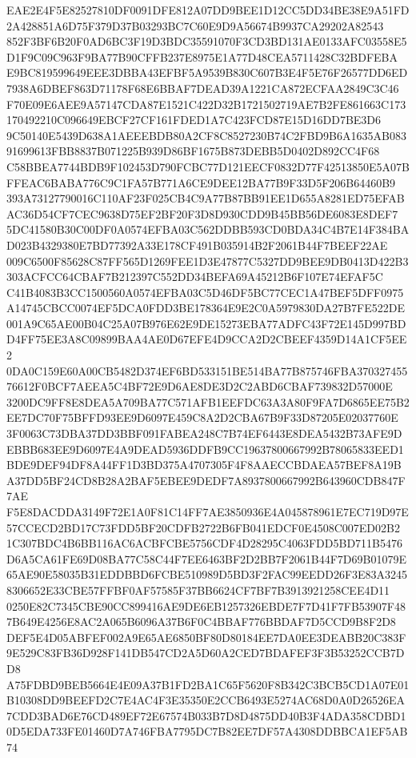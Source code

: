 \documentclass[UTF8,fontset=fandol,zihao=-4,a4paper]{ctexart}
\begin{document}
{{EAE2E4F5E82527810DF0091DFE812A07DD9BEE1D12CC5DD34BE38E9A51FD2A428851A6D75F379D37B03293BC7C60E9D9A56674B9937CA29202A82543
852F3BF6B20F0AD6BC3F19D3BDC35591070F3CD3BD131AE0133AFC03558E5D1F9C09C963F9BA77B90CFFB237E8975E1A77D48CEA5711428C32BDFEBA
E9BC819599649EEE3DBBA43EFBF5A9539B830C607B3E4F5E76F26577DD6ED7938A6DBEF863D71178F68E6BBAF7DEAD39A1221CA872ECFAA2849C3C46
F70E09E6AEE9A57147CDA87E1521C422D32B1721502719AE7B2FE861663C173170492210C096649EBCF27CF161FDED1A7C423FCD87E15D16DD7BE3D6
9C50140E5439D638A1AEEEBDB80A2CF8C8527230B74C2FBD9B6A1635AB08391699613FBB8837B071225B939D86BF1675B873DEBB5D0402D892CC4F68
C58BBEA7744BDB9F102453D790FCBC77D121EECF0832D77F42513850E5A07BFFEAC6BABA776C9C1FA57B771A6CE9DEE12BA77B9F33D5F206B64460B9
393A73127790016C110AF23F025CB4C9A77B87BB91EE1D655A8281ED75EFABAC36D54CF7CEC9638D75EF2BF20F3D8D930CDD9B45BB56DE6083E8DEF7
5DC41580B30C00DF0A0574EFBA03C562DDBB593CD0BDA34C4B7E14F384BAD023B4329380E7BD77392A33E178CF491B035914B2F2061B44F7BEEF22AE
009C6500F85628C87FF565D1269FEE1D3E47877C5327DD9BEE9DB0413D422B3303ACFCC64CBAF7B212397C552DD34BEFA69A45212B6F107E74EFAF5C
C41B4083B3CC1500560A0574EFBA03C5D46DF5BC77CEC1A47BEF5DFF0975A14745CBCC0074EF5DCA0FDD3BE178364E9E2C0A5979830DA27B7FE522DE
001A9C65AE00B04C25A07B976E62E9DE15273EBA77ADFC43F72E145D997BDD4FF75EE3A8C09899BAA4AE0D67EFE4D9CCA2D2CBEEF4359D14A1CF5EE2
0DA0C159E60A00CB5482D374EF6BD533151BE514BA77B875746FBA37032745576612F0BCF7AEEA5C4BF72E9D6AE8DE3D2C2ABD6CBAF739832D57000E
3200DC9FF8E8DEA5A709BA77C571AFB1EEFDC63A3A80F9FA7D6865EE75B2EE7DC70F75BFFD93EE9D6097E459C8A2D2CBA67B9F33D87205E02037760E
3F0063C73DBA37DD3BBF091FABEA248C7B74EF6443E8DEA5432B73AFE9DEBBB683EE9D6097E4A9DEAD5936DDFB9CC19637800667992B78065833EED1
BDE9DEF94DF8A44FF1D3BD375A4707305F4F8AAECCBDAEA57BEF8A19BA37DD5BF24CD8B28A2BAF5EBEE9DEDF7A8937800667992B643960CDB847F7AE
F5E8DACDDA3149F72E1A0F81C14FF7AE3850936E4A045878961E7EC719D97E57CCECD2BD17C73FDD5BF20CDFB2722B6FB041EDCF0E4508C007ED02B2
1C307BDC4B6BB116AC6ACBFCBE5756CDF4D28295C4063FDD5BD711B5476D6A5CA61FE69D08BA77C58C44F7EE6463BF2D2BB7F2061B44F7D69B01079E
65AE90E58035B31EDDBBD6FCBE510989D5BD3F2FAC99EEDD26F3E83A32458306652E33CBE57FFBF0AF57585F37BB6624CF7BF7B3913921258CEE4D11
0250E82C7345CBE90CC899416AE9DE6EB1257326EBDE7F7D41F7FB53907F487B649E4256E8AC2A065B6096A37B6F0C4BBAF776BBDAF7D5CCD9B8F2D8
DEF5E4D05ABFEF002A9E65AE6850BF80D80184EE7DA0EE3DEABB20C383F9E529C83FB36D928F141DB547CD2A5D60A2CED7BDAFEF3F3B53252CCB7DD8
A75FDBD9BEB5664E4E09A37B1FD2BA1C65F5620F8B342C3BCB5CD1A07E01B10308DD9BEEFD2C7E4AC4F3E35350E2CCB6493E5274AC68D0A0D26526EA
7CDD3BAD6E76CD489EF72E67574B033B7D8D4875DD40B3F4ADA358CDBD10D5EDA733FE01460D7A746FBA7795DC7B82EE7DF57A4308DDBBCA1EF5AB74
}}
\end{document}
